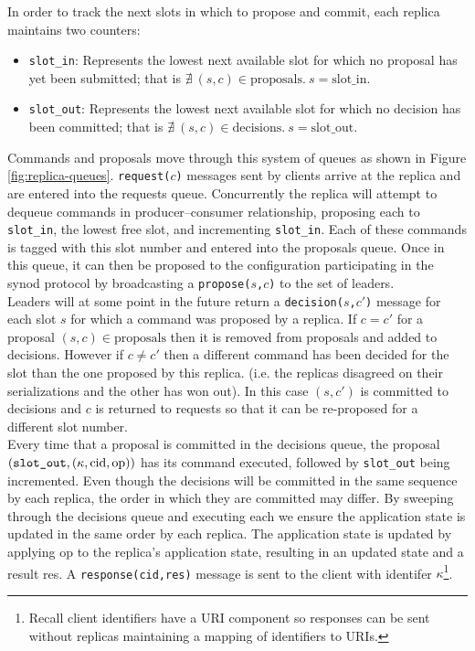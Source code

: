 In order to track the next slots in which to propose and commit, each replica maintains two counters:
\begin{itemize}
  \item \texttt{slot\_in}: Represents the lowest next available slot for which no proposal has yet been submitted; that is $\nexists  \ \left( s, c \right) \in \textrm{proposals}. \ s = \textrm{slot\_in}$.
  \item \texttt{slot\_out}: Represents the lowest next available slot for which no decision has been committed; that is $\nexists \ \left( s, c \right) \in \textrm{decisions}. \ s = \textrm{slot\_out}$.
\end{itemize}

Commands and proposals move through this system of queues as shown in Figure \ref{fig:replica-queues}. \texttt{request($c$)} messages sent by clients arrive at the replica and are entered into the requests queue. Concurrently the replica will attempt to dequeue commands in producer--consumer relationship, proposing each to \texttt{slot\_in}, the lowest free slot, and incrementing \texttt{slot\_in}. Each of these commands is tagged with this slot number and entered into the proposals queue. Once in this queue, it can then be proposed to the configuration participating in the synod protocol by broadcasting a \texttt{propose($s$,$c$)} to the set of leaders. \\

Leaders will at some point in the future return a \texttt{decision($s$,$c'$)} message for each slot $s$ for which a command was proposed by a replica. If $c = c'$ for a proposal $\left(s,c\right) \in \textrm{proposals}$ then it is removed from proposals and added to decisions. However if $c \neq c'$ then a different command has been decided for the slot than the one proposed by this replica. (i.e. the replicas disagreed on their serializations and the other has won out). In this case $\left(s,c'\right)$ is committed to decisions and $c$ is returned to requests so that it can be re-proposed for a different slot number. \\

Every time that a proposal is committed in the decisions queue, the proposal $\left( \textrm{\texttt{slot\_out}}, \left( \kappa, \textrm{cid}, \textrm{op} \right) \right)$ has its command executed, followed by \texttt{slot\_out} being incremented. Even though the decisions will be committed in the same sequence by each replica, the order in which they are committed may differ. By sweeping through the decisions queue and executing each we ensure the application state is updated in the same order by each replica. The application state is updated by applying op to the replica's application state, resulting in an updated state and a result res. A \texttt{response(cid,res)} message is sent to the client with identifer $\kappa$\footnote{Recall client identifiers have a URI component so responses can be sent without replicas maintaining a mapping of identifiers to URIs.}. \\

